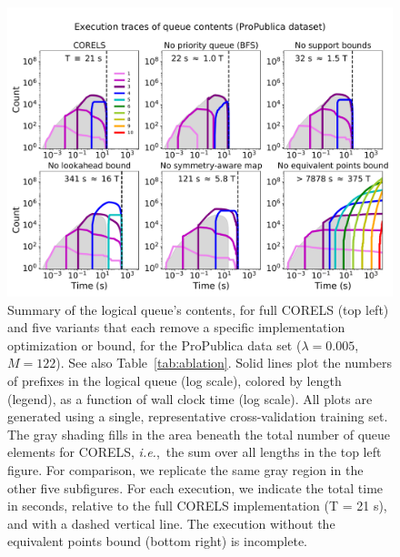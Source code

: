 \documentclass[twoside,11pt]{article}
\def\ie{{\it i.e.},~}
\def\Reg{{\lambda}}
\begin{document}
\begin{figure}[t!]
\begin{center}
\includegraphics[trim={0mm 0mm 0mm 15mm}, width=\textwidth]{figs/jmlr_compas_ablation-queue.pdf}
\end{center}
\vspace{-5mm}
\caption{Summary of the logical queue's contents, for full CORELS (top left)
and five variants that each remove a specific implementation optimization or bound,
for the ProPublica data set (${\Reg = 0.005}$, ${M = 122}$).  See also Table~\ref{tab:ablation}.
%
Solid lines plot the numbers of prefixes in the logical queue (log scale), colored by length (legend),
as a function of wall clock time (log scale).
%
All plots are generated using a single, representative cross-validation training set.
%
The gray shading fills in the area beneath the total number of
queue elements for CORELS,
\ie the sum over all lengths in the top left figure.
%
For comparison, we replicate the same gray region
in the other five subfigures.
%
For each execution, we indicate the total time in seconds,
relative to the full CORELS implementation (T = 21 s),
and with a dashed vertical line.
%
The execution without the equivalent points bound (bottom right) is incomplete.
}
\label{fig:queue}
\end{figure}
\end{document}

